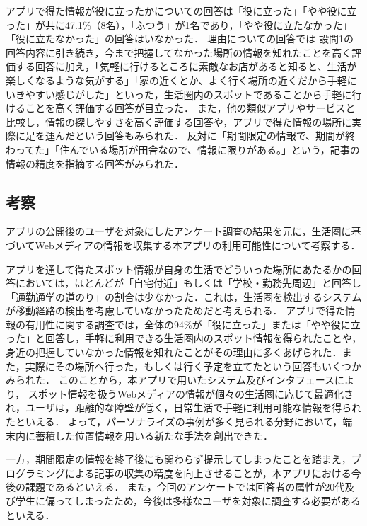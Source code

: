 \documentclass[a4paper]{jsarticle}
\begin{document}
\begin{enumerate}
\begin{enumerate}
\begin{enumerate}
  アプリで得た情報が役に立ったかについての回答は「役に立った」「やや役に立った」が共に47.1\%（8名），「ふつう」が1名であり，「やや役に立たなかった」「役に立たなかった」の回答はいなかった．
  理由についての回答では
  設問1の回答内容に引き続き，今まで把握してなかった場所の情報を知れたことを高く評価する回答に加え，「気軽に行けるところに素敵なお店があると知ると、生活が楽しくなるような気がする」「家の近くとか、よく行く場所の近くだから手軽にいきやすい感じがした」といった，生活圏内のスポットであることから手軽に行けることを高く評価する回答が目立った．
  また，他の類似アプリやサービスと比較し，情報の探しやすさを高く評価する回答や，アプリで得た情報の場所に実際に足を運んだという回答もみられた．
  反対に「期間限定の情報で、期間が終わってた」「住んでいる場所が田舎なので、情報に限りがある。」という，記事の情報の精度を指摘する回答がみられた．



\end{enumerate}


\subsection{考察}
アプリの公開後のユーザを対象にしたアンケート調査の結果を元に，生活圏に基づいてWebメディアの情報を収集する本アプリの利用可能性について考察する．

アプリを通して得たスポット情報が自身の生活でどういった場所にあたるかの回答においては，ほとんどが「自宅付近」もしくは「学校・勤務先周辺」と回答し「通勤通学の道のり」の割合は少なかった．これは，生活圏を検出するシステムが移動経路の検出を考慮していなかったためだと考えられる．
アプリで得た情報の有用性に関する調査では，全体の94\%が「役に立った」または「やや役に立った」と回答し，手軽に利用できる生活圏内のスポット情報を得られたことや，身近の把握していなかった情報を知れたことがその理由に多くあげられた．また，実際にその場所へ行った，もしくは行く予定を立てたという回答もいくつかみられた．
このことから，本アプリで用いたシステム及びインタフェースにより，
スポット情報を扱うWebメディアの情報が個々の生活圏に応じて最適化され，ユーザは，距離的な障壁が低く，日常生活で手軽に利用可能な情報を得られたといえる．
よって，パーソナライズの事例が多く見られる分野において，端末内に蓄積した位置情報を用いる新たな手法を創出できた．

一方，期間限定の情報を終了後にも関わらず提示してしまったことを踏まえ，プログラミングによる記事の収集の精度を向上させることが，本アプリにおける今後の課題であるといえる．
また，今回のアンケートでは回答者の属性が20代及び学生に偏ってしまったため，今後は多様なユーザを対象に調査する必要があるといえる．


\end{enumerate}
\end{enumerate}
\end{document}
